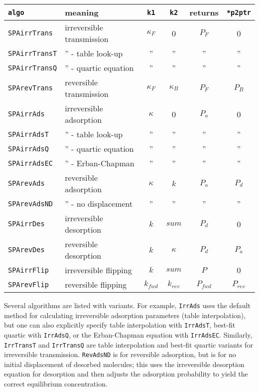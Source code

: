 \documentclass[11pt]{article}
\newcommand {\ttt} {\texttt}
\begin{document}
\begin{description}
\begin{longtable}[c]{llcccc}
\ttt{algo} & meaning & \ttt{k1} & \ttt{k2} & returns & \ttt{*p2ptr}\\
\hline
\ttt{SPAirrTrans} & irreversible transmission & $\kappa_F$ & 0 & $P_F$ & 0\\
\ttt{SPAirrTransT} & '' - table look-up & '' & '' & '' & ''\\
\ttt{SPAirrTransQ} & '' - quartic equation & '' & '' & '' & ''\\
\ttt{SPArevTrans} & reversible transmission & $\kappa_F$ & $\kappa_B$ & $P_F$ & $P_B$\\
\ttt{SPAirrAds} & irreversible adsorption & $\kappa$ & 0 & $P_a$ & 0\\
\ttt{SPAirrAdsT} & '' - table look-up & '' & '' & '' & ''\\
\ttt{SPAirrAdsQ} & '' - quartic equation & '' & '' & '' & ''\\
\ttt{SPAirrAdsEC} & '' - Erban-Chapman & '' & '' & '' & ''\\
\ttt{SPArevAds} & reversible adsorption & $\kappa$ & $k$ & $P_a$ & $P_d$\\
\ttt{SPArevAdsND} & '' - no displacement & '' & '' & '' & ''\\
\ttt{SPAirrDes} & irreversible desorption & $k$ & $sum$ & $P_d$ & 0\\
\ttt{SPArevDes} & reversible desorption & $k$ & $\kappa$ & $P_d$ & $P_a$\\
\ttt{SPAirrFlip} & irreversible flipping & $k$ & $sum$ & $P$ & 0\\
\ttt{SPArevFlip} & reversible flipping & $k_{fwd}$ & $k_{rev}$ & $P_{fwd}$ & $P_{rev}$
\end{longtable}

Several algorithms are listed with variants. For example, \ttt{IrrAds} uses the default method for calculating irreversible adsorption parameters (table interpolation), but one can also explicitly specify table interpolation with \ttt{IrrAdsT}, best-fit quartic with \ttt{IrrAdsQ}, or the Erban-Chapman equation with \ttt{IrrAdsEC}. Similarly, \ttt{IrrTransT} and \ttt{IrrTransQ} are table interpolation and best-fit quartic variants for irreversible transmission. \ttt{RevAdsND} is for reversible adsorption, but is for no initial displacement of desorbed molecules; this uses the irreversible desorption equation for desorption and then adjusts the adsorption probability to yield the correct equilibrium concentration.


\end{description}
\end{document}
